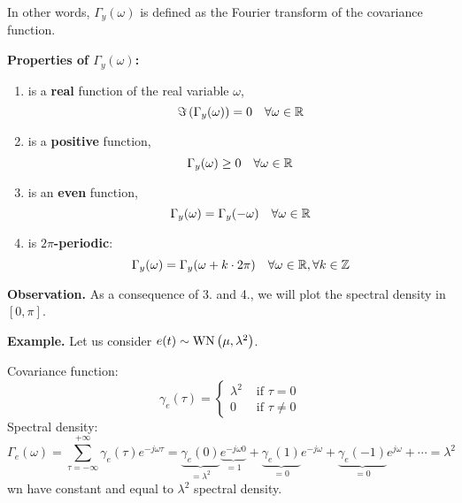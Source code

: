 In other words, $\Gamma_y(\omega)$ is defined as the Fourier transform of the covariance function.

\textbf{Properties of $\Gamma_{y}(\omega)$:}
\begin{enumerate}
	\item is a \textbf{real} function of the real variable $\omega$,
	$$
		\Im\left(\Gamma_{y}(\omega)\right)=0 \quad \forall \omega \in \mathbb{R}
	$$
	\item is a \textbf{positive} function,
	$$
		\Gamma_{y}(\omega) \geq 0 \quad \forall \omega \in \mathbb{R}
	$$
	\item is an \textbf{even} function,
	$$
		\Gamma_{y}(\omega)=\Gamma_{y}(-\omega) \quad \forall \omega \in \mathbb{R}
	$$
	\item is \textbf{$2\pi$-periodic}:
	$$
		\Gamma_{y}(\omega)=\Gamma_{y}(\omega+k \cdot 2 \pi) \quad \forall \omega \in \mathbb{R}, \forall k \in \mathbb{Z}
	$$
\end{enumerate}

\textbf{Observation.}
As a consequence of 3. and 4., we will plot the spectral density in $[0, \pi]$.

\textbf{Example.}
Let us consider $e(t) \sim \operatorname{WN}\left(\mu, \lambda^{2}\right)$. 

Covariance function:
\[
	\gamma_{e}(\tau)= \begin{cases}\lambda^{2} & \text { if } \tau=0 \\ 0 & \text { if } \tau \neq 0\end{cases}
\]
Spectral density:
\[
	\Gamma_{e}(\omega) =\sum_{\tau=-\infty}^{+\infty} \gamma_{e}(\tau) e^{-j \omega \tau}=\underbrace{\gamma_{e}(0)}_{=\lambda^2} \underbrace{e^{-j \omega 0}}_{=1}+\underbrace{\gamma_{e}(1)}_{=0} e^{-j \omega} + \underbrace{\gamma_{e}(-1)}_{=0} e^{j \omega}+\cdots = \lambda^{2}
\]
\gls{wn} have constant and equal to $\lambda^{2}$ spectral density.

